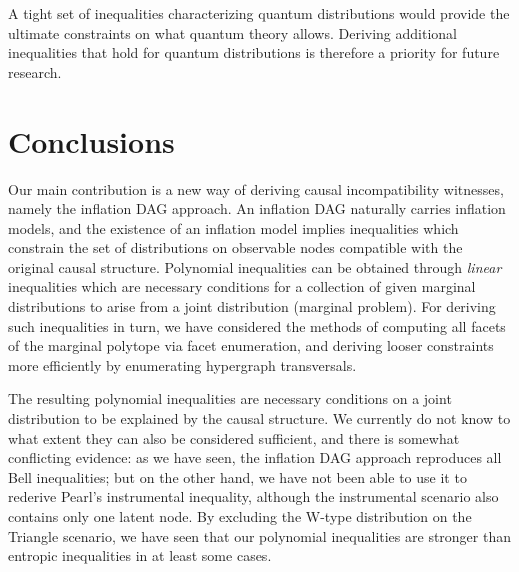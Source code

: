 A tight set of inequalities characterizing quantum distributions would provide the ultimate constraints on what quantum theory allows. Deriving additional inequalities that hold for quantum distributions is therefore a priority for future research.








\section{Conclusions}

Our main contribution is a new way of deriving causal incompatibility witnesses, namely the inflation DAG approach. An inflation DAG naturally carries inflation models, and the existence of an inflation model implies inequalities which constrain the set of distributions on observable nodes compatible with the original causal structure. Polynomial inequalities can be obtained through \emph{linear} inequalities which are necessary conditions for a collection of given marginal distributions to arise from a joint distribution (marginal problem). For deriving such inequalities in turn, we have considered the methods of computing all facets of the marginal polytope via facet enumeration, and deriving looser constraints more efficiently by enumerating hypergraph transversals.

The resulting polynomial inequalities are necessary conditions on a joint distribution to be explained by the causal structure. We currently do not know to what extent they can also be considered sufficient, and there is somewhat conflicting evidence: as we have seen, the inflation DAG approach reproduces all Bell inequalities; but on the other hand, we have not been able to use it to rederive Pearl's instrumental inequality, although the instrumental scenario also contains only one latent node. By excluding the W-type distribution on the Triangle scenario, we have seen that our polynomial inequalities are stronger than entropic inequalities in at least some cases.

